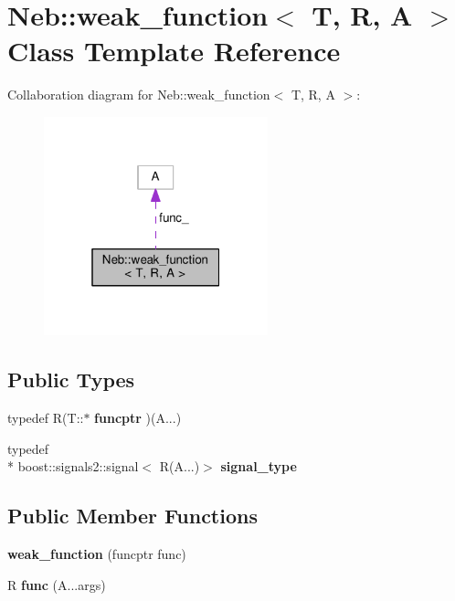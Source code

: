 \hypertarget{classNeb_1_1weak__function}{\section{Neb\-:\-:weak\-\_\-function$<$ T, R, A $>$ Class Template Reference}
\label{classNeb_1_1weak__function}
}


Collaboration diagram for Neb\-:\-:weak\-\_\-function$<$ T, R, A $>$\-:
\nopagebreak
\begin{figure}[H]
\begin{center}
\leavevmode
\includegraphics[width=184pt]{classNeb_1_1weak__function__coll__graph}
\end{center}
\end{figure}
\subsection*{Public Types}
\begin{DoxyCompactItemize}
\item 
\hypertarget{classNeb_1_1weak__function_ae1907cb79bcd88603d11bb7fea734b8c}{typedef R(T\-::$\ast$ {\bfseries funcptr} )(A...)}\label{classNeb_1_1weak__function_ae1907cb79bcd88603d11bb7fea734b8c}

\item 
\hypertarget{classNeb_1_1weak__function_a46d7f953b289ec9292937a4e7082abd0}{typedef \\*
boost\-::signals2\-::signal$<$ R(A...)$>$ {\bfseries signal\-\_\-type}}\label{classNeb_1_1weak__function_a46d7f953b289ec9292937a4e7082abd0}

\end{DoxyCompactItemize}
\subsection*{Public Member Functions}
\begin{DoxyCompactItemize}
\item 
\hypertarget{classNeb_1_1weak__function_a748cd930266832c1116f6a31e27ab484}{{\bfseries weak\-\_\-function} (funcptr func)}\label{classNeb_1_1weak__function_a748cd930266832c1116f6a31e27ab484}

\item 
\hypertarget{classNeb_1_1weak__function_afd7f9127a6a12e347f0e4594360c884c}{R {\bfseries func} (A...\-args)}\label{classNeb_1_1weak__function_afd7f9127a6a12e347f0e4594360c884c}

\end{DoxyCompactItemize}
